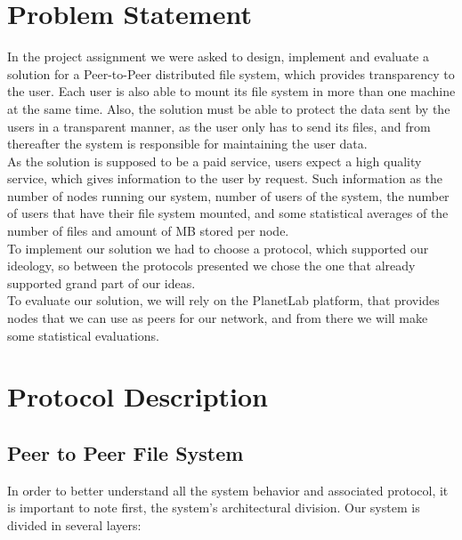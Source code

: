 \documentclass[times,9pt,article]{llncs}
\begin{document}
\section{Problem Statement}
In the project assignment we were asked to design, implement and evaluate a solution for a Peer-to-Peer distributed file system, which provides transparency to the user. Each user is also able to mount its file system in more than one machine at the same time. Also, the solution must be able to protect the data sent by the users in a transparent manner, as the user only has to send its files, and from thereafter the system is responsible for maintaining the user data.\\
As the solution is supposed to be a paid service, users expect a high quality service, which gives information to the user by request. Such information as the number of nodes running our system, number of users of the system, the number of users that have their file system mounted, and some statistical averages of the number of files and amount of MB stored per node.\\
To implement our solution we had to choose a protocol, which supported our ideology, so between the protocols presented we chose the one that already supported grand part of our ideas.\\
To evaluate our solution, we will rely on the PlanetLab platform, that provides nodes that we can use as peers for our network, and from there we will make some statistical evaluations.

\section{Protocol Description}

\subsection{Peer to Peer File System}
In order to better understand all the system behavior and associated protocol, it is important to note first, the system's architectural division. Our system is divided in several layers:
\end{document}
